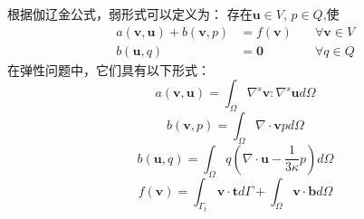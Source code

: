 根据伽辽金公式，弱形式可以定义为：
存在$\boldsymbol u \in V$, $p \in Q$,使
\begin{equation}
    \begin{aligned}
        a(\boldsymbol v, \boldsymbol u) + b(\boldsymbol v, p) &= f(\boldsymbol v) \quad &\forall \boldsymbol v \in V \\
        b(\boldsymbol u, q) &= \boldsymbol 0 \quad &\forall q \in Q
    \end{aligned}
\end{equation}
在弹性问题中，它们具有以下形式：
\begin{equation}
    a(\boldsymbol v, \boldsymbol u) = \int_\Omega \nabla^s \boldsymbol v : \nabla^s \boldsymbol u d\Omega
\end{equation}
\begin{equation}
    b(\boldsymbol v, p) = \int_\Omega \nabla \cdot \boldsymbol v p d\Omega
\end{equation}
\begin{equation}
    b(\boldsymbol u, q) = \int_\Omega q(\nabla \cdot \boldsymbol u - \frac{1}{3\kappa} p)d\Omega
\end{equation}
\begin{equation}
    f(\boldsymbol v) = \int_{\Gamma_t} \boldsymbol v \cdot \boldsymbol t d\Gamma + \int_{\Omega} \boldsymbol v \cdot \boldsymbol b d\Omega
\end{equation}

